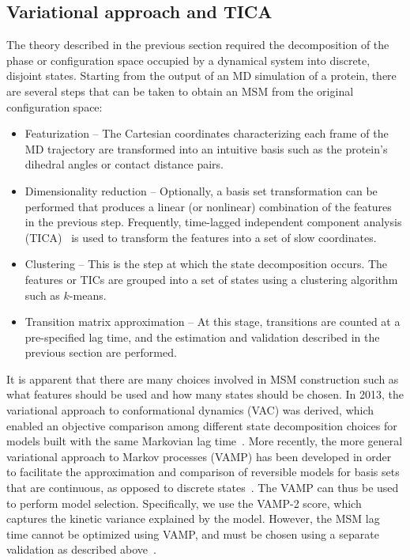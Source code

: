\documentclass[9pt,tutorial]{livecoms}
\begin{document}
\subsection{Variational approach and TICA}

The theory described in the previous section required the decomposition of the phase or configuration space occupied by a dynamical system into discrete, disjoint states.
Starting from the output of an MD simulation of a protein, there are several steps that can be taken to obtain an MSM from the original configuration space:

\begin{itemize}
	\item Featurization -- The Cartesian coordinates characterizing each frame of the MD trajectory are transformed into an intuitive basis such as the protein's dihedral angles or contact distance pairs.
	\item Dimensionality reduction -- Optionally, a basis set transformation can be performed that produces a linear (or nonlinear) combination of the features in the previous step.
	Frequently, time-lagged independent component analysis (TICA)~\cite{tica,tica3,kinetic-maps} is used to transform the features into a set of slow coordinates.
	\item Clustering -- This is the step at which the state decomposition occurs.
	The features or TICs are grouped into a set of states using a clustering algorithm such as $k$-means.
	\item Transition matrix approximation -- At this stage, transitions are counted at a pre-specified lag time, and the estimation and validation described in the previous section are performed.
\end{itemize}

It is apparent that there are many choices involved in MSM construction such as what features should be used and how many states should be chosen.
In 2013, the variational approach to conformational dynamics (VAC) was derived,
which enabled an objective comparison among different state decomposition choices for models built with the same Markovian lag time~\cite{noe-vac}.
More recently, the more general variational approach to Markov processes (VAMP) has been developed in order to facilitate the approximation and comparison of reversible models for basis sets that are continuous,
as opposed to discrete states~\cite{vamp-preprint}.
The VAMP can thus be used to perform model selection.
Specifically, we use the VAMP-2 score, which captures the kinetic variance explained by the model.
However, the MSM lag time cannot be optimized using VAMP,
and must be chosen using a separate validation as described above~\cite{husic2017note}.
\end{document}
